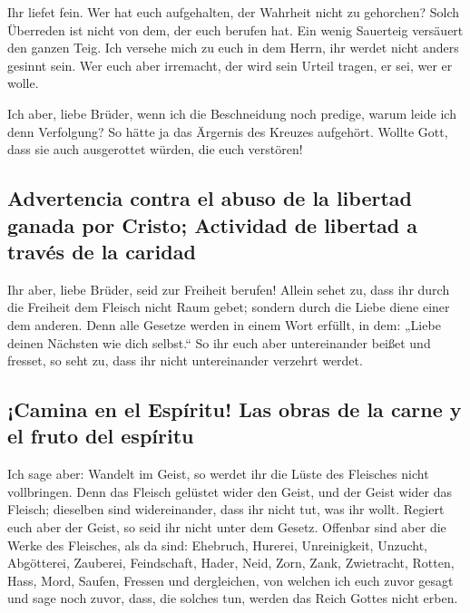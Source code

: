  Ihr liefet fein. Wer hat euch aufgehalten, der Wahrheit
nicht zu gehorchen?  Solch Überreden ist nicht von dem,
der euch berufen hat.  Ein wenig Sauerteig versäuert den
ganzen Teig.  Ich versehe mich zu euch in dem Herrn, ihr
werdet nicht anders gesinnt sein. Wer euch aber irremacht, der wird sein
Urteil tragen, er sei, wer er wolle.

 Ich aber, liebe Brüder, wenn ich die Beschneidung noch
predige, warum leide ich denn Verfolgung? So hätte ja das Ärgernis des
Kreuzes aufgehört.  Wollte Gott, dass sie auch
ausgerottet würden, die euch verstören!

\hypertarget{advertencia-contra-el-abuso-de-la-libertad-ganada-por-cristo-actividad-de-libertad-a-travuxe9s-de-la-caridad}{%
\subsection{Advertencia contra el abuso de la libertad ganada por
Cristo; Actividad de libertad a través de la
caridad}\label{advertencia-contra-el-abuso-de-la-libertad-ganada-por-cristo-actividad-de-libertad-a-travuxe9s-de-la-caridad}}

 Ihr aber, liebe Brüder, seid zur Freiheit berufen!
Allein sehet zu, dass ihr durch die Freiheit dem Fleisch nicht Raum
gebet; sondern durch die Liebe diene einer dem anderen. 
Denn alle Gesetze werden in einem Wort erfüllt, in dem: „Liebe deinen
Nächsten wie dich selbst.``  So ihr euch aber
untereinander beißet und fresset, so seht zu, dass ihr nicht
untereinander verzehrt werdet.

\hypertarget{camina-en-el-espuxedritu-las-obras-de-la-carne-y-el-fruto-del-espuxedritu}{%
\subsection{¡Camina en el Espíritu! Las obras de la carne y el fruto del
espíritu}\label{camina-en-el-espuxedritu-las-obras-de-la-carne-y-el-fruto-del-espuxedritu}}

 Ich sage aber: Wandelt im Geist, so werdet ihr die Lüste
des Fleisches nicht vollbringen.  Denn das Fleisch
gelüstet wider den Geist, und der Geist wider das Fleisch; dieselben
sind widereinander, dass ihr nicht tut, was ihr wollt. 
Regiert euch aber der Geist, so seid ihr nicht unter dem Gesetz.
 Offenbar sind aber die Werke des Fleisches, als da sind:
Ehebruch, Hurerei, Unreinigkeit, Unzucht,  Abgötterei,
Zauberei, Feindschaft, Hader, Neid, Zorn, Zank, Zwietracht, Rotten,
Hass, Mord,  Saufen, Fressen und dergleichen, von welchen
ich euch zuvor gesagt und sage noch zuvor, dass, die solches tun, werden
das Reich Gottes nicht erben.

